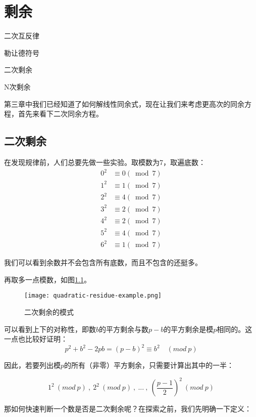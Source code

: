 \chapter{剩余}

\begin{introduction}
\item 二次互反律
\item 勒让德符号
\item 二次剩余
\item N次剩余
\end{introduction}

\vbox{}

第三章中我们已经知道了如何解线性同余式，现在让我们来考虑更高次的同余方程，首先来看下二次同余方程。

\section{二次剩余}
在发现规律前，人们总要先做一些实验。取模数为7，取遍底数：
$$
\begin{aligned} 0^{2} & \equiv 0(\bmod 7) \\ 1^{2} & \equiv 1(\bmod 7) \\ 2^{2} & \equiv 4(\bmod 7) \\ 3^{2} & \equiv 2(\bmod 7) \\ 4^{2} & \equiv 2(\bmod 7) \\ 5^{2} & \equiv 4(\bmod 7) \\ 6^{2} & \equiv 1(\bmod 7) \end{aligned}
$$

我们可以看到余数并不会包含所有底数，而且不包含的还挺多。

再取多一点模数，如图\ref{fig:quadratic-residue-example}。

\begin{figure}[htbp]
	\centering
	\texttt{[image: quadratic-residue-example.png]}
	\caption{二次剩余的模式 \label{fig:quadratic-residue-example}}
\end{figure}

可以看到上下的对称性，即数$b$的平方剩余与数$p-b$的平方剩余是模$p$相同的。这一点也比较好证明：
$$
p^2+b^2-2pb=(p-b)^2\equiv b^2 \quad (mod \ p)
$$

因此，若要列出模$p$的所有（非零）平方剩余，只需要计算出其中的一半：

$$
1^2\ (mod \ p)\ ,\ 2^2\ (mod \ p)\ ,\ ...\ ,\ (\frac{p-1}{2})^2 \ (mod \ p)
$$

那如何快速判断一个数是否是二次剩余呢？在探索之前，我们先明确一下定义：

